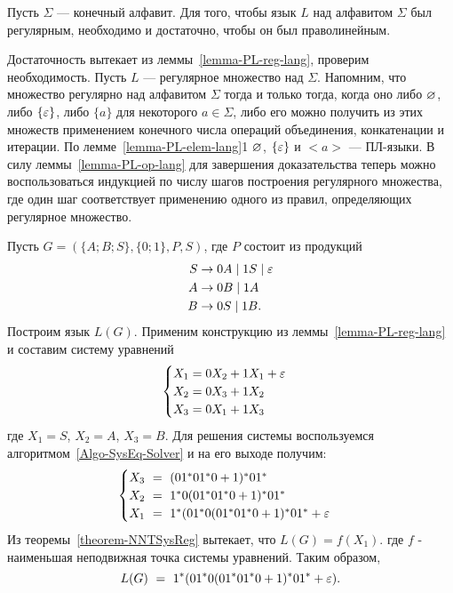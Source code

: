 \begin{mytheorem}
\label{threorem-RegExp-PL241}
Пусть $\Sigma$ --- конечный алфавит. Для того, чтобы язык $L$ над алфавитом $\Sigma$ был регулярным, необходимо и достаточно, чтобы он был праволинейным.
\end{mytheorem}

\begin{myproof}
Достаточность вытекает из леммы~\ref{lemma-PL-reg-lang}, проверим необходимость. Пусть $L$ --- регулярное множество над $\Sigma$. Напомним, что множество регулярно над алфавитом $\Sigma$ тогда и только тогда, когда оно либо $\varnothing$, либо $\{\varepsilon\}$, либо $\{a\}$ для некоторого $a\in\Sigma$, либо его можно получить из этих множеств применением конечного числа операций объединения, конкатенации и итерации. По лемме~\ref{lemma-PL-elem-lang}1 $\varnothing$, $\{\varepsilon\}$ и $<a>$ --- ПЛ-языки. В силу леммы~\ref{lemma-PL-op-lang} для завершения доказательства теперь можно воспользоваться индукцией по числу шагов построения регулярного множества, где один шаг соответствует применению одного из правил, определяющих регулярное множество.
\end{myproof}

\begin{myexample}
\label{example-FindRegLang}
Пусть $G=(\{A;B;S\},\{0;1\},P,S)$, где $P$ состоит из продукций
\begin{align*}
	S &\to 0A \mid 1S \mid \varepsilon\\
    A &\to 0B \mid 1A\\
    B &\to 0S \mid 1B.
\end{align*}
Построим язык $L(G)$. Применим конструкцию из леммы~\ref{lemma-PL-reg-lang} и составим систему уравнений
\begin{equation*}
\begin{cases}
	X_1 = 0X_2 + 1X_1 + \varepsilon \\
    X_2 = 0X_3 + 1X_2 \\
    X_3 = 0X_1 + 1X_3
\end{cases}
\end{equation*}
где $X_1=S$, $X_2=A$, $X_3=B$. Для решения системы воспользуемся алгоритмом~\ref{Algo-SysEq-Solver} и на его выходе получим:
\begin{equation*}
\begin{cases}
	X_3~=~(01^*01^*0+1)^*01^* \\
    X_2~=~1^*0(01^*01^*0+1)^*01^* \\
    X_1~=~1^*(01^*0(01^*01^*0+1)^*01^*+\varepsilon
\end{cases}
\end{equation*}
Из теоремы~\ref{theorem-NNTSysReg} вытекает, что $L(G)=f(X_1)$. где $f$ - наименьшая неподвижная точка системы уравнений. Таким образом,
\[
	L(G)~=~1^*(01^*0(01^*01^*0+1)^*01^*+\varepsilon).
\]
\end{myexample}

